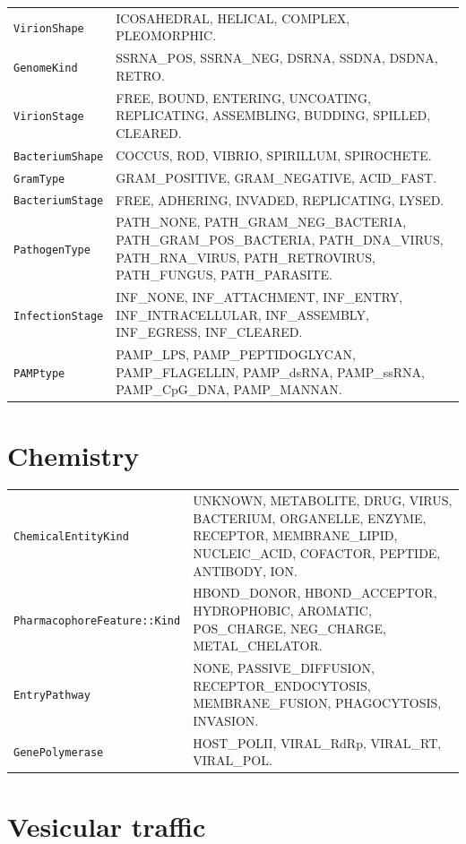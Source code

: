 \documentclass[11pt,letterpaper,twoside,openany]{book}
\newcommand{\code}[1]{\texttt{#1}}
\begin{document}
\begin{longtable}{p{4.2cm}p{10.0cm}}
\toprule
\code{VirionShape}     & ICOSAHEDRAL, HELICAL, COMPLEX, PLEOMORPHIC.\\
\code{GenomeKind}      & SSRNA\_POS, SSRNA\_NEG, DSRNA, SSDNA, DSDNA, RETRO.\\
\code{VirionStage}     & FREE, BOUND, ENTERING, UNCOATING, REPLICATING, ASSEMBLING, BUDDING, SPILLED, CLEARED.\\
\code{BacteriumShape}  & COCCUS, ROD, VIBRIO, SPIRILLUM, SPIROCHETE.\\
\code{GramType}        & GRAM\_POSITIVE, GRAM\_NEGATIVE, ACID\_FAST.\\
\code{BacteriumStage}  & FREE, ADHERING, INVADED, REPLICATING, LYSED.\\
\code{PathogenType}    & PATH\_NONE, PATH\_GRAM\_NEG\_BACTERIA, PATH\_GRAM\_POS\_BACTERIA, PATH\_DNA\_VIRUS, PATH\_RNA\_VIRUS, PATH\_RETROVIRUS, PATH\_FUNGUS, PATH\_PARASITE.\\
\code{InfectionStage}  & INF\_NONE, INF\_ATTACHMENT, INF\_ENTRY, INF\_INTRACELLULAR, INF\_ASSEMBLY, INF\_EGRESS, INF\_CLEARED.\\
\code{PAMPtype}        & PAMP\_LPS, PAMP\_PEPTIDOGLYCAN, PAMP\_FLAGELLIN, PAMP\_dsRNA, PAMP\_ssRNA, PAMP\_CpG\_DNA, PAMP\_MANNAN.\\
\bottomrule
\end{longtable}

\section{Chemistry}

\begin{longtable}{p{4.6cm}p{9.6cm}}
\toprule
\code{ChemicalEntityKind} & UNKNOWN, METABOLITE, DRUG, VIRUS, BACTERIUM, ORGANELLE, ENZYME, RECEPTOR, MEMBRANE\_LIPID, NUCLEIC\_ACID, COFACTOR, PEPTIDE, ANTIBODY, ION.\\
\code{PharmacophoreFeature::Kind} & HBOND\_DONOR, HBOND\_ACCEPTOR, HYDROPHOBIC, AROMATIC, POS\_CHARGE, NEG\_CHARGE, METAL\_CHELATOR.\\
\code{EntryPathway}       & NONE, PASSIVE\_DIFFUSION, RECEPTOR\_ENDOCYTOSIS, MEMBRANE\_FUSION, PHAGOCYTOSIS, INVASION.\\
\code{GenePolymerase}     & HOST\_POLII, VIRAL\_RdRp, VIRAL\_RT, VIRAL\_POL.\\
\bottomrule
\end{longtable}

\section{Vesicular traffic}
\end{document}
